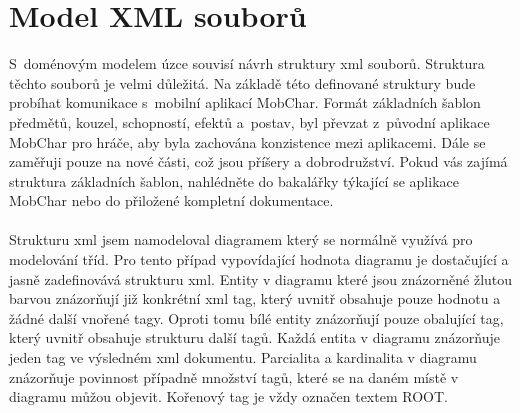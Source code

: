 \documentclass[thesis=B,czech]{resources/FITthesis}[2012/06/26]
\begin{document}
	\section{Model XML souborů}
S~doménovým modelem úzce souvisí návrh struktury xml souborů. Struktura těchto souborů je velmi důležitá. Na základě této definované struktury bude probíhat komunikace s~mobilní aplikací MobChar. Formát základních šablon předmětů, kouzel, schopností, efektů a~postav, byl převzat z~původní aplikace MobChar pro hráče, aby byla zachována konzistence mezi aplikacemi. Dále se zaměřuji pouze na nové části, což jsou příšery a dobrodružství. Pokud vás zajímá struktura základních šablon, nahlédněte do bakalářky týkající se aplikace MobChar nebo do přiložené kompletní dokumentace.\\
\\
Strukturu xml jsem namodeloval diagramem který se normálně využívá pro modelování tříd. Pro tento případ vypovídající hodnota diagramu je dostačující a jasně zadefinovává strukturu xml. Entity v diagramu které jsou znázorněné žlutou barvou znázorňují již konkrétní xml tag, který uvnitř obsahuje pouze hodnotu a žádné další vnořené tagy. Oproti tomu bílé entity znázorňují pouze obalující tag, který uvnitř obsahuje strukturu další tagů. Každá entita v diagramu znázorňuje jeden tag ve výsledném xml dokumentu. Parcialita a kardinalita v diagramu znázorňuje povinnost případně množství tagů, které se na daném místě v diagramu můžou objevit. Kořenový tag je vždy označen textem  \clqq ROOT\crqq .
\end{document}
